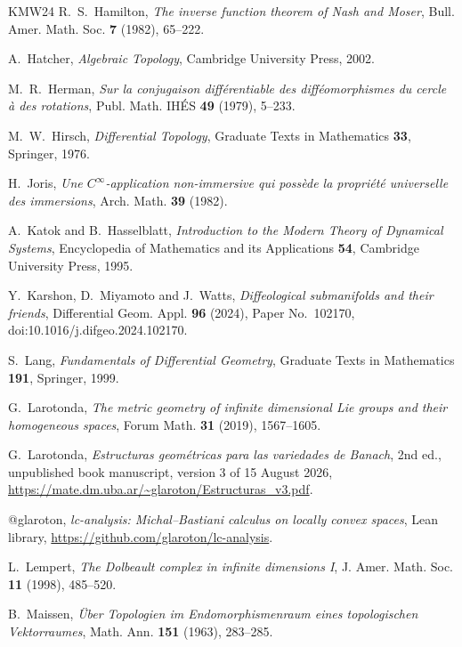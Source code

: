\begin{thebibliography}{KMW24}
R.~S.~Hamilton, \emph{The inverse function theorem of Nash and Moser}, Bull. Amer. Math. Soc.
\textbf{7} (1982), 65--222.

A.~Hatcher, \emph{Algebraic Topology}, Cambridge University Press, 2002.

M.~R.~Herman, \emph{Sur la conjugaison différentiable des difféomorphismes du cercle à des
rotations}, Publ. Math. IHÉS \textbf{49} (1979), 5--233.

M.~W.~Hirsch, \emph{Differential Topology}, Graduate Texts in Mathematics \textbf{33}, Springer,
1976.

H.~Joris, \emph{Une $C^\infty$-application non-immersive qui possède la propriété universelle
des immersions}, Arch. Math. \textbf{39} (1982).

A.~Katok and B.~Hasselblatt, \emph{Introduction to the Modern Theory of Dynamical Systems},
Encyclopedia of Mathematics and its Applications \textbf{54}, Cambridge University Press, 1995.

Y.~Karshon, D.~Miyamoto and J.~Watts, \emph{Diffeological submanifolds and their friends},
Differential Geom. Appl. \textbf{96} (2024), Paper No.~102170, doi:10.1016/j.difgeo.2024.102170.

S.~Lang, \emph{Fundamentals of Differential Geometry}, Graduate Texts in Mathematics
\textbf{191}, Springer, 1999.

G.~Larotonda, \emph{The metric geometry of infinite dimensional Lie groups and their
homogeneous spaces}, Forum Math. \textbf{31} (2019), 1567--1605.

G.~Larotonda, \emph{Estructuras geométricas para las variedades de Banach}, 2nd ed., unpublished book
manuscript, version 3 of 15 August 2026,
\url{https://mate.dm.uba.ar/~glaroton/Estructuras_v3.pdf}.

@glaroton, \emph{lc-analysis: Michal--Bastiani calculus on locally convex spaces}, Lean
library, \url{https://github.com/glaroton/lc-analysis}.

L.~Lempert, \emph{The Dolbeault complex in infinite dimensions I}, J. Amer. Math. Soc.
\textbf{11} (1998), 485--520.

B.~Maissen, \emph{Über Topologien im Endomorphismenraum eines topologischen Vektorraumes},
Math. Ann. \textbf{151} (1963), 283--285.


\end{thebibliography}
